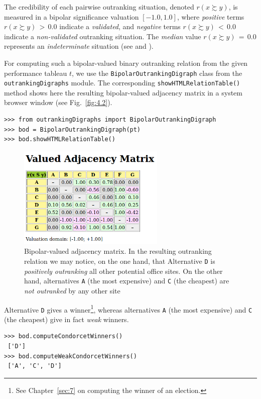 The credibility of each pairwise outranking situation, denoted $r(x \succsim y)$, is measured in a bipolar significance valuation $[-1.0, 1.0]$, where \emph{positive} terms $r(x \succsim y)\, >\, 0.0$ indicate a \emph{validated}, and \emph{negative} terms $r(x \succsim y)\, <\, 0.0$ indicate a \emph{non-validated} outranking situation. The \emph{median} value $r(x \succsim y)\, = \,0.0$ represents an \emph{indeterminate} situation (see \citealp{BIS-2004a} and \citealp{BIS-2013}).   

For computing such a bipolar-valued binary outranking relation from the given performance tableau $t$, we use the \texttt{BipolarOutrankingDigraph} class from the \texttt{outrankingDigraphs} module. The corresponding
\texttt{showHTMLRe\-lation\-Table()} method shows here the resulting bipolar-valued adjacency matrix in a system browser window (see Fig.~\vref{fig:4.2}).
\begin{lstlisting}[caption={Computing a bipolar-valued outranking digraph},label=list:4.3]
>>> from outrankingDigraphs import BipolarOutrankingDigraph
>>> bod = BipolarOutrankingDigraph(pt)
>>> bod.showHTMLRelationTable()
\end{lstlisting}
\begin{figure}[ht]
\sidecaption[t]
\includegraphics[width=7cm]{Figures/4-2-officeChoiceOutranking.png}
\caption{Bipolar-valued adjacency matrix. In the resulting outranking relation we may notice, on the one hand, that Alternative \texttt{D} is \emph{positively outranking} all other potential office sites. On the other hand, alternatives \texttt{A} (the most expensive) and \texttt{C} (the cheapest) are \emph{not outranked} by any other site}
\label{fig:4.2}       %
\end{figure}

Alternative \texttt{D} gives a \Condorcet winner\footnote{See Chapter~\ref{sec:7} on computing the winner of an election.}, whereas alternatives \texttt{A} (the most expensive) and \texttt{C} (the cheapest) give in fact \emph{weak} \Condorcet winners.
\begin{lstlisting}
>>> bod.computeCondorcetWinners()
 ['D']
>>> bod.computeWeakCondorcetWinners()
 ['A', 'C', 'D']
\end{lstlisting}

